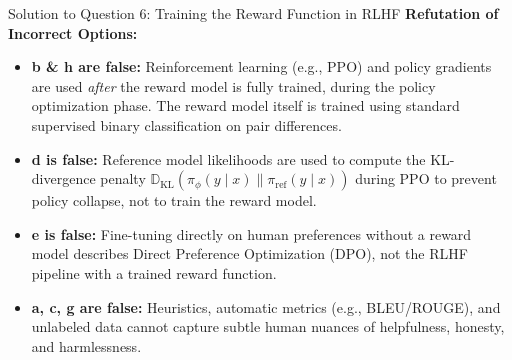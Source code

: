 \documentclass[11pt,a4paper]{article}
\begin{document}
\begin{solutionbox}{Solution to Question 6: Training the Reward Function in RLHF}
\medskip
\noindent
\textbf{Refutation of Incorrect Options:}
\begin{itemize}[leftmargin=1.5em]
    \item \textbf{b \& h are false:} Reinforcement learning (e.g., PPO) and policy gradients are used \emph{after} the reward model is fully trained, during the policy optimization phase. The reward model itself is trained using standard supervised binary classification on pair differences.
    \item \textbf{d is false:} Reference model likelihoods are used to compute the KL-divergence penalty $\mathbb{D}_{\text{KL}}(\pi_\phi(y \mid x) \parallel \pi_{\text{ref}}(y \mid x))$ during PPO to prevent policy collapse, not to train the reward model.
    \item \textbf{e is false:} Fine-tuning directly on human preferences without a reward model describes Direct Preference Optimization (DPO), not the RLHF pipeline with a trained reward function.
    \item \textbf{a, c, g are false:} Heuristics, automatic metrics (e.g., BLEU/ROUGE), and unlabeled data cannot capture subtle human nuances of helpfulness, honesty, and harmlessness.
\end{itemize}
\end{solutionbox}

\vspace{1.5em}
\end{document}
